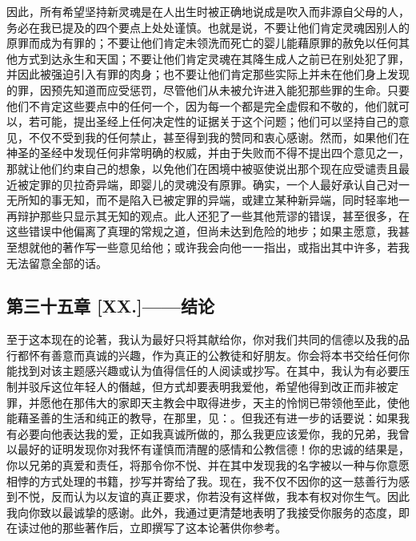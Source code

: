 因此，所有希望坚持新灵魂是在人出生时被正确地说成是吹入而非源自父母的人，务必在我已提及的四个要点上处处谨慎。也就是说，不要让他们肯定灵魂因别人的原罪而成为有罪的；不要让他们肯定未领洗而死亡的婴儿能藉原罪的赦免以任何其他方式到达永生和天国；不要让他们肯定灵魂在其降生成人之前已在别处犯了罪，并因此被强迫引入有罪的肉身；也不要让他们肯定那些实际上并未在他们身上发现的罪，因预先知道而应受惩罚，尽管他们从未被允许进入能犯那些罪的生命。只要他们不肯定这些要点中的任何一个，因为每一个都是完全虚假和不敬的，他们就可以，若可能，提出圣经上任何决定性的证据关于这个问题；他们可以坚持自己的意见，不仅不受到我的任何禁止，甚至得到我的赞同和衷心感谢。然而，如果他们在神圣的圣经中发现任何非常明确的权威，并由于失败而不得不提出四个意见之一，那就让他们约束自己的想象，以免他们在困境中被驱使说出那个现在应受谴责且最近被定罪的贝拉奇异端，即婴儿的灵魂没有原罪。确实，一个人最好承认自己对一无所知的事无知，而不是陷入已被定罪的异端，或建立某种新异端，同时轻率地一再辩护那些只显示其无知的观点。此人还犯了一些其他荒谬的错误，甚至很多，在这些错误中他偏离了真理的常规之道，但尚未达到危险的地步；如果主愿意，我甚至想就他的著作写一些意见给他；或许我会向他一一指出，或指出其中许多，若我无法留意全部的话。\par


\subsection{第三十五章 [XX.]——结论}

至于这本现在的论著，我认为最好只将其献给你，你对我们共同的信德以及我的品行都怀有善意而真诚的兴趣，作为真正的公教徒和好朋友。你会将本书交给任何你能找到对该主题感兴趣或认为值得信任的人阅读或抄写。在其中，我认为有必要压制并驳斥这位年轻人的僭越，但方式却要表明我爱他，希望他得到改正而非被定罪，并愿他在那伟大的家即天主教会中取得进步，天主的怜悯已带领他至此，使他能藉圣善的生活和纯正的教导，在那里，见：。但我还有进一步的话要说：如果我有必要向他表达我的爱，正如我真诚所做的，那么我更应该爱你，我的兄弟，我曾以最好的证明发现你对我怀有谨慎而清醒的感情和公教信德！你的忠诚的结果是，你以兄弟的真爱和责任，将那令你不悦、并在其中发现我的名字被以一种与你意愿相悖的方式处理的书籍，抄写并寄给了我。现在，我不仅不因你的这一慈善行为感到不悦，反而认为以友谊的真正要求，你若没有这样做，我本有权对你生气。因此我向你致以最诚挚的感谢。此外，我通过更清楚地表明了我接受你服务的态度，即在读过他的那些著作后，立即撰写了这本论著供你参考。\par

